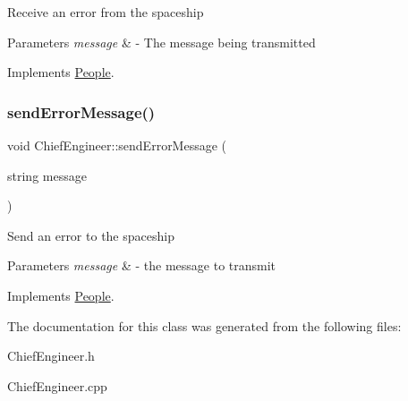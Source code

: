 Receive an error from the spaceship 
\begin{DoxyParams}{Parameters}
{\em message} & -\/ The message being transmitted \\
\hline
\end{DoxyParams}


Implements \hyperlink{classPeople_a0685df78be631783138865e03cc7c85d}{People}.

\mbox{\label{classChiefEngineer_afe5a4677f7651fff2926c0583875a666}} 
\subsubsection{\texorpdfstring{send\+Error\+Message()}{sendErrorMessage()}}
{\footnotesize\ttfamily void Chief\+Engineer\+::send\+Error\+Message (\begin{DoxyParamCaption}\item[{string}]{message }\end{DoxyParamCaption})\hspace{0.3cm}{\ttfamily [virtual]}}

Send an error to the spaceship 
\begin{DoxyParams}{Parameters}
{\em message} & -\/ the message to transmit \\
\hline
\end{DoxyParams}


Implements \hyperlink{classPeople_a572a35170f61d1848eb04b65baafb057}{People}.



The documentation for this class was generated from the following files\+:\begin{DoxyCompactItemize}
\item 
Chief\+Engineer.\+h\item 
Chief\+Engineer.\+cpp\end{DoxyCompactItemize}
